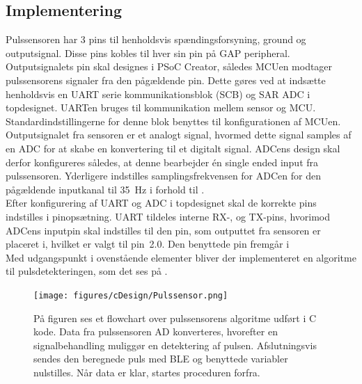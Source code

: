 \subsection{Implementering} \label{puls_impl}
Pulssensoren har 3 pins til henholdsvis spændingsforsyning, ground og outputsignal. Disse pins kobles til hver sin pin på GAP peripheral. Outputsignalets pin skal designes i PSoC Creator, således MCUen modtager pulssensorens signaler fra den pågældende pin. Dette gøres ved at indsætte henholdsvis en UART serie kommunikationsblok (SCB) og SAR ADC i topdesignet. UARTen bruges til kommunikation mellem sensor og MCU. Standardindstillingerne for denne blok benyttes til konfigurationen af MCUen. \newline
Outputsignalet fra sensoren er et analogt signal, hvormed dette signal samples af en ADC for at skabe en konvertering til et digitalt signal. ADCens design skal derfor konfigureres således, at denne bearbejder én single ended input fra pulssensoren. Yderligere indstilles samplingsfrekvensen for ADCen for den pågældende inputkanal til 35~Hz i forhold til . \\
Efter konfigurering af UART og ADC i topdesignet skal de korrekte pins indstilles i pinopsætning. UART tildeles interne RX-, og TX-pins, hvorimod ADCens inputpin skal indstilles til den pin, som outputtet fra sensoren er placeret i, hvilket er valgt til pin~2.0. Den benyttede pin fremgår i  \\
Med udgangspunkt i ovenstående elementer bliver der implementeret en algoritme til pulsdetekteringen, som det ses på .
\begin{figure}[H]
	\centering
	\texttt{[image: figures/cDesign/Pulssensor.png]}
	\caption{På figuren ses et flowchart over pulssensorens algoritme udført i C kode. Data fra pulssensoren AD konverteres, hvorefter en signalbehandling muliggør en detektering af pulsen. Afslutningsvis sendes den beregnede puls med BLE og benyttede variabler nulstilles. Når data er klar, startes proceduren forfra.}
	\label{fig:puls_pseudo_c}
\end{figure} \vspace{-.25cm}
